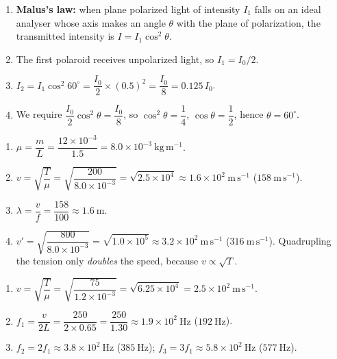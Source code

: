 \documentclass[11pt]{article}
\newcounter{popsec}
\newcounter{popsub}
\newcommand{\courssub}[1]{%
  \stepcounter{popsub}%
  \par\vspace{9pt}\noindent{\popxbold\fontsize{11.5}{13}\selectfont\color{popink}{\color{poporange}\thepopsec.\thepopsub}\hspace{6pt}#1}\par\nopagebreak\vspace{4pt}
}
\begin{document}
\courssub{I practise}

\begin{corrige}
\begin{enumerate}
\item \textbf{Malus's law:} when plane polarized light of intensity $I_1$ falls on an ideal analyser whose axis makes an angle $\theta$ with the plane of polarization, the transmitted intensity is $I=I_1\cos^2\theta$.
\item The first polaroid receives unpolarized light, so $I_1=I_0/2$.
\item $I_2=I_1\cos^2 60^{\circ}=\dfrac{I_0}{2}\times(0.5)^2=\dfrac{I_0}{8}=0.125\,I_0$.
\item We require $\dfrac{I_0}{2}\cos^2\theta=\dfrac{I_0}{8}$, so $\cos^2\theta=\dfrac{1}{4}$, $\cos\theta=\dfrac{1}{2}$, hence $\theta=60^{\circ}$.
\end{enumerate}
\end{corrige}

\begin{corrige}
\begin{enumerate}
\item $\mu=\dfrac{m}{L}=\dfrac{12\times10^{-3}}{1.5}=8.0\times10^{-3}\ \mathrm{kg\,m^{-1}}$.
\item $v=\sqrt{\dfrac{T}{\mu}}=\sqrt{\dfrac{200}{8.0\times10^{-3}}}=\sqrt{2.5\times10^{4}}\approx 1.6\times10^{2}\ \mathrm{m\,s^{-1}}$ ($158\ \mathrm{m\,s^{-1}}$).
\item $\lambda=\dfrac{v}{f}=\dfrac{158}{100}\approx 1.6\ \mathrm{m}$.
\item $v'=\sqrt{\dfrac{800}{8.0\times10^{-3}}}=\sqrt{1.0\times10^{5}}\approx 3.2\times10^{2}\ \mathrm{m\,s^{-1}}$ ($316\ \mathrm{m\,s^{-1}}$). Quadrupling the tension only \emph{doubles} the speed, because $v\propto\sqrt{T}$.
\end{enumerate}
\end{corrige}

\begin{corrige}
\begin{enumerate}
\item $v=\sqrt{\dfrac{T}{\mu}}=\sqrt{\dfrac{75}{1.2\times10^{-3}}}=\sqrt{6.25\times10^{4}}=2.5\times10^{2}\ \mathrm{m\,s^{-1}}$.
\item $f_1=\dfrac{v}{2L}=\dfrac{250}{2\times0.65}=\dfrac{250}{1.30}\approx 1.9\times10^{2}\ \mathrm{Hz}$ ($192\ \mathrm{Hz}$).
\item $f_2=2f_1\approx 3.8\times10^{2}\ \mathrm{Hz}$ ($385\ \mathrm{Hz}$); $f_3=3f_1\approx 5.8\times10^{2}\ \mathrm{Hz}$ ($577\ \mathrm{Hz}$).
\end{enumerate}
\end{corrige}
\end{document}
